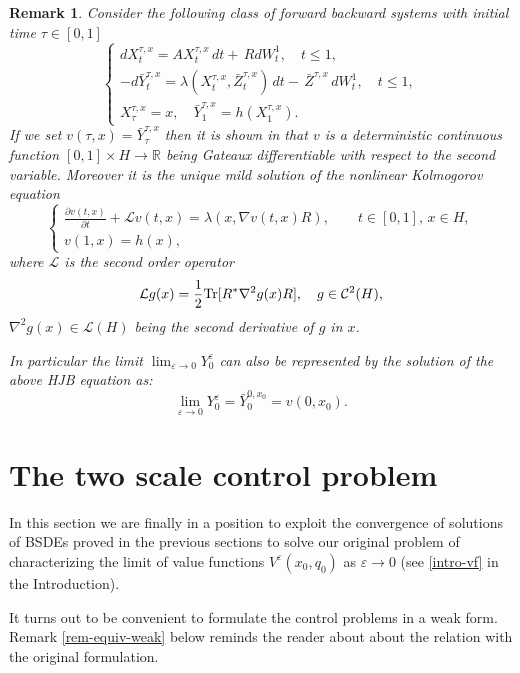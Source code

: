 \documentclass[reqno,a4paper,11 pt]{article}
\def \e {\varepsilon}
\newtheorem{remark}[theorem]{Remark}
\numberwithin{equation}{section}
\begin{document}
\begin{remark} {\em Consider the following class of forward backward systems with initial time $\tau\in [0,1]$
 \begin{equation} \label{LimitEquationinitialdata}
\begin{cases}
d X^{\tau,x}_t =   AX^{\tau,x}_t \, dt + \, R d W^1 _t,\quad t\leq 1,  \\
-d\bar{Y}^{\tau,x}_t  =\lambda({X}^{\tau,x}_t,\bar{Z}^{\tau,x}_t)\,dt - \, \bar{Z}^{\tau,x}\, dW^1_t,\quad t\leq 1,   \\
X^{\tau,x}_\tau= x, \quad \bar{Y}_1^{\tau,x}=h(X^{\tau,x}_1).
\end{cases} 
\end{equation}  
If we set $v(\tau,x) = \bar{Y}^{\tau,x}_\tau$ then it is shown in \cite{FuTes_BE} that $v$ is a deterministic continuous function $[0,1]\times H\rightarrow \mathbb{R}$ being Gateaux differentiable with respect to the second variable. Moreover it is the unique mild solution of the nonlinear Kolmogorov equation
$$ \left\{\begin{array}{l}\displaystyle
\frac{\partial v(t,x)}{\partial t}+\mathcal{L} v(t,x) = \lambda (
x,\nabla v(t,x)R),\qquad t\in [0,1],\,
x\in H,\\
\displaystyle v(1,x)=h(x),
\end{array}\right.
$$
where $\mathcal{L}$ is the second order operator $$\mathcal{L}g(x)=\frac{1}{2}\hbox{Tr}[R^*\nabla^2 g(x)R ],\quad g\in \mathcal{C}^2(H),$$
$\nabla^2 g(x) \in \mathcal{L}(H)$ being the second derivative of $g$ in $x$.

In particular the limit $\lim_{\e\rightarrow 0}Y^{\e}_0$ can also be represented by the solution of the above HJB  equation as:
$$\lim_{\e\rightarrow 0}Y^{\e}_0=\bar{Y}^{0,x_0}_0=v(0,x_0).$$
}\end{remark} 

\section{The two scale control problem}

In this section we are finally in a position to exploit the convergence of solutions of BSDEs proved in the previous sections to solve our original problem of characterizing the limit of value functions $
V^{\e}(x_0,q_0)$ as $\e\rightarrow 0$ (see \eqref{intro-vf} in the Introduction).

\medskip

It turns out to be convenient to formulate the control problems in a weak form. Remark \ref{rem-equiv-weak} below reminds the reader about about the relation with the original formulation.
\end{document}
